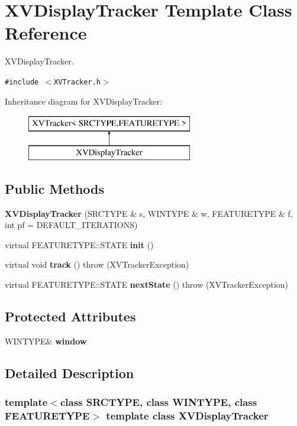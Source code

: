 \hypertarget{class_XVDisplayTracker}{
\section{XVDisplay\-Tracker  Template Class Reference}
\label{XVDisplayTracker}
}
XVDisplay\-Tracker. 


{\tt \#include $<$XVTracker.h$>$}

Inheritance diagram for XVDisplay\-Tracker:\begin{figure}[H]
\begin{center}
\leavevmode
\includegraphics[height=2cm]{class_XVDisplayTracker}
\end{center}
\end{figure}
\subsection*{Public Methods}
\begin{CompactItemize}
\item 
{\bf XVDisplay\-Tracker} (SRCTYPE \& s, WINTYPE \& w, FEATURETYPE \& f, int pf = DEFAULT\_\-ITERATIONS)
\item 
virtual FEATURETYPE::STATE {\bf init} ()
\item 
virtual void {\bf track} ()  throw (XVTracker\-Exception)
\item 
virtual FEATURETYPE::STATE {\bf next\-State} ()  throw (XVTracker\-Exception)
\end{CompactItemize}
\subsection*{Protected Attributes}
\begin{CompactItemize}
\item 
WINTYPE\& {\bf window}
\end{CompactItemize}


\subsection{Detailed Description}
\subsubsection*{template$<$class SRCTYPE, class WINTYPE, class FEATURETYPE$>$  template class XVDisplay\-Tracker}

